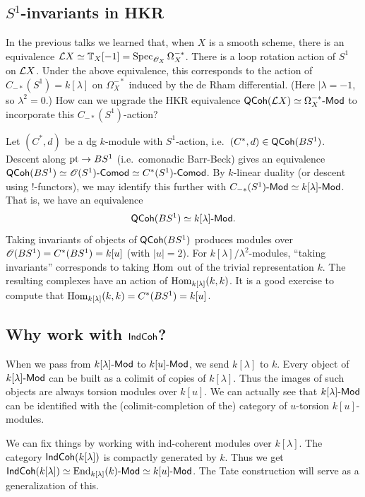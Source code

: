 \documentclass{article}
\begin{document}
\subsection{$S^1$-invariants in HKR}

In the previous talks we learned that, when $X$ is a smooth scheme, there is an equivalence $\mathcal{L} X \simeq \mathbb{T}_X[-1] = \operatorname{Spec}_{\mathscr{O}_X} \Omega_X^{-*}$.
There is a loop rotation action of $S^1$ on $\mathcal{L} X$.
Under the above equivalence, this corresponds to the action of $C_{-*}(S^1) = k[\lambda]$ on $\Omega_X^{-*}$ induced by the de Rham differential.
(Here $|\lambda = -1$, so $\lambda^2 = 0$.)
How can we upgrade the HKR equivalence $\mathsf{QCoh}(\mathcal{L} X) \simeq \Omega_X^{-*}\text{-}\mathsf{Mod}$ to incorporate this $C_{-*}(S^1)$-action?

Let $(C^*, d)$ be a dg $k$-module with $S^1$-action, i.e.\ $(C^*, d) \in \mathsf{QCoh}(BS^1)$.
Descent along $\operatorname{pt} \to BS^1$ (i.e.\ comonadic Barr-Beck) gives an equivalence $\mathsf{QCoh}(BS^1) \simeq \mathscr{O}(S^1)\text{-}\mathsf{Comod} \simeq C^*(S^1)\text{-}\mathsf{Comod}$.
By $k$-linear duality (or descent using $!$-functors), we may identify this further with $C_{-*}(S^1)\text{-}\mathsf{Mod} \simeq k[\lambda]\text{-}\mathsf{Mod}$.
That is, we have an equivalence
\[
  \mathsf{QCoh}(BS^1) \simeq k[\lambda]\text{-}\mathsf{Mod}.
\]
Taking invariants of objects of $\mathsf{QCoh}(BS^1)$ produces modules over $\mathscr{O}(BS^1) = C^*(BS^1) = k[u]$ (with $|u| = 2$).
For $k[\lambda] / \lambda^2$-modules, ``taking invariants'' corresponds to taking $\operatorname{Hom}$ out of the trivial representation $k$.
The resulting complexes have an action of $\operatorname{Hom}_{k[\lambda]}(k, k)$.
It is a good exercise to compute that $\operatorname{Hom}_{k[\lambda]}(k, k) = C^*(BS^1) = k[u]$.

\subsection{Why work with $\mathsf{IndCoh}$?}

When we pass from $k[\lambda]\text{-}\mathsf{Mod}$ to $k[u]\text{-}\mathsf{Mod}$, we send $k[\lambda]$ to $k$.
Every object of $k[\lambda]\text{-}\mathsf{Mod}$ can be built as a colimit of copies of $k[\lambda]$.
Thus the images of such objects are always torsion modules over $k[u]$.
We can actually see that $k[\lambda]\text{-}\mathsf{Mod}$ can be identified with the (colimit-completion of the) category of $u$-torsion $k[u]$-modules.

We can fix things by working with ind-coherent modules over $k[\lambda]$.
The category $\mathsf{IndCoh}(k[\lambda])$ is compactly generated by $k$.
Thus we get $\mathsf{IndCoh}(k[\lambda]) \simeq \operatorname{End}_{k[\lambda]}(k)\text{-}\mathsf{Mod} \simeq k[u]\text{-}\mathsf{Mod}$.
The Tate construction will serve as a generalization of this.
\end{document}
